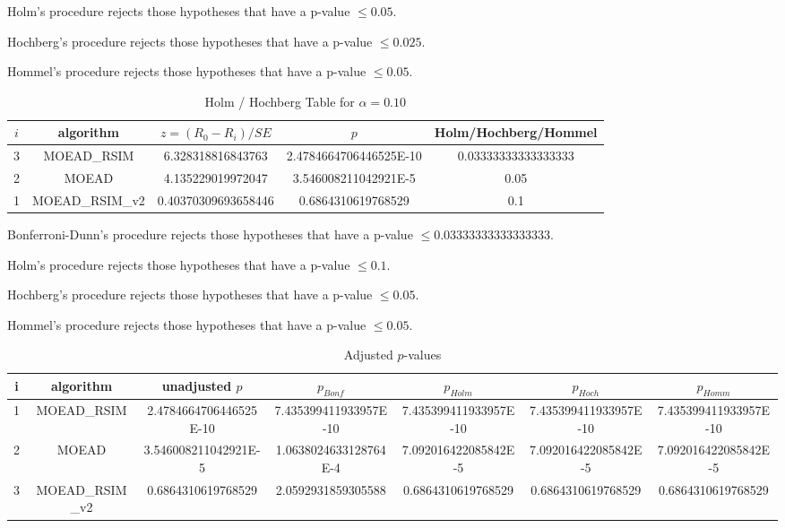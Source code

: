 \documentclass[a4paper,10pt]{article}
\begin{document}
\begin{landscape}
Holm's procedure rejects those hypotheses that have a p-value $\le0.05$.


Hochberg's procedure rejects those hypotheses that have a p-value $\le0.025$.


Hommel's procedure rejects those hypotheses that have a p-value $\le0.05$.


\begin{table}[!htp]
\centering\tiny
\caption{Holm / Hochberg Table for $\alpha=0.10$}
\begin{tabular}{ccccc}
$i$&algorithm&$z=(R_0 - R_i)/SE$&$p$&Holm/Hochberg/Hommel\\
\hline
3&MOEAD_RSIM&6.328318816843763&2.4784664706446525E-10&0.03333333333333333\\
2&MOEAD&4.135229019972047&3.546008211042921E-5&0.05\\
1&MOEAD_RSIM_v2&0.40370309693658446&0.6864310619768529&0.1\\
\hline
\end{tabular}
\end{table}
Bonferroni-Dunn's procedure rejects those hypotheses that have a p-value $\le0.03333333333333333$.


Holm's procedure rejects those hypotheses that have a p-value $\le0.1$.


Hochberg's procedure rejects those hypotheses that have a p-value $\le0.05$.


Hommel's procedure rejects those hypotheses that have a p-value $\le0.05$.


\begin{table}[!htp]
\centering\tiny
\caption{Adjusted $p$-values}
\begin{tabular}{ccccccc}
i&algorithm&unadjusted $p$&$p_{Bonf}$&$p_{Holm}$&$p_{Hoch}$&$p_{Homm}$\\
\hline
1&MOEAD_RSIM&2.4784664706446525E-10&7.435399411933957E-10&7.435399411933957E-10&7.435399411933957E-10&7.435399411933957E-10\\
2&MOEAD&3.546008211042921E-5&1.0638024633128764E-4&7.092016422085842E-5&7.092016422085842E-5&7.092016422085842E-5\\
3&MOEAD_RSIM_v2&0.6864310619768529&2.0592931859305588&0.6864310619768529&0.6864310619768529&0.6864310619768529\\
\hline
\end{tabular}
\end{table}


\end{landscape}
\end{document}
